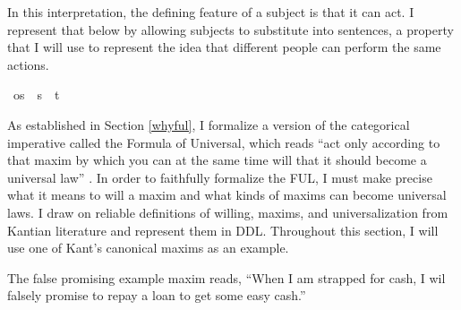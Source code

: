 \begin{isabellebody}
\begin{isamarkuptext}
In this interpretation, the defining feature of a subject is that it can act. 
I represent that below by allowing subjects to substitute into sentences, a property that I will use 
to represent the idea that different people can perform the same actions.%
\end{isamarkuptext}\isamarkuptrue%
\isamarkupfalse%
\ os\ {\isacharequal}\ {\isachardoublequoteopen}{\isacharparenleft}s\ {\isasymRightarrow}\ t{\isacharparenright}{\isachardoublequoteclose}\ \isanewline
%
%
\isadelimdocument
%
\endisadelimdocument
%
\isatagdocument
%
\isamarkuptrue%
%
\endisatagdocument
{\isafolddocument}%
%
\isadelimdocument
%
\endisadelimdocument
%
\begin{isamarkuptext}%
As established in Section \ref{whyful}, I formalize a version of the categorical imperative called
the Formula of Universal, which reads ``act only according to that maxim by which you can at the same 
time will that it should become a universal law'' \citep{groundwork}. In order to faithfully formalize
the FUL, I must make precise what it means to will a maxim and what kinds of maxims can become universal laws. 
I draw on reliable definitions of willing, maxims, and universalization from Kantian literature and represent them in DDL.
Throughout this section, I will use one of Kant's canonical maxims as an example.

\begin{example}\label{falsepromise}
  The false promising example maxim reads, ``When I am strapped for cash, I wil falsely promise to repay a loan 
to get some easy cash.''
\end{example}


\end{isamarkuptext}
\end{isabellebody}
